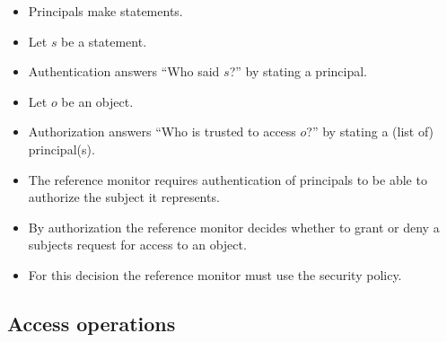 \documentclass{beamer}
\begin{document}
\begin{frame}
  \begin{definition}[Authentication]
    \begin{itemize}
      \item Principals make statements.

      \item Let \(s\) be a statement.

      \item Authentication answers \enquote{Who said \(s\)?} by stating 
        a principal.
    \end{itemize}
  \end{definition}

  \pause{}

  \begin{definition}[Authorization]
    \begin{itemize}
      \item Let \(o\) be an object.

      \item Authorization answers \enquote{Who is trusted to access \(o\)?} by 
        stating a (list of) principal(s).
    \end{itemize}
  \end{definition}
\end{frame}

\begin{frame}
  \begin{idea}
    \begin{itemize}
      \item The reference monitor requires authentication of principals to be 
        able to authorize the subject it represents.

      \item By authorization the reference monitor decides whether to grant or 
        deny a subjects request for access to an object.

      \item For this decision the reference monitor must use the security policy.
    \end{itemize}
  \end{idea}
\end{frame}


\subsection{Access operations}
\end{document}
